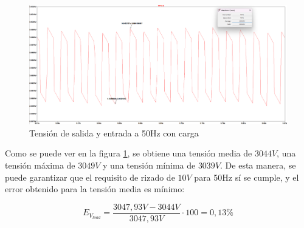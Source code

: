 \begin{figure}[H]
    \centering
    \includegraphics[width=1\textwidth]{Imagenes_alvaro/Vout_50hz_load.png}
    \caption{Tensión de salida y entrada a 50Hz con carga}
    \label{Vout_50hz_load}
\end{figure}

Como se puede ver en la figura \ref{Vout_50hz_load}, se obtiene una tensión media de $3044V$, una tensión máxima de $3049V$ y una tensión
mínima de $3039V$. De esta manera, se puede garantizar que el requisito de rizado de $10V$ para 50Hz sí se cumple, y el error obtenido 
para la tensión media es mínimo:

\begin{equation}
    E_{V_{load}} = \frac{3047,93V - 3044V}{3047,93V} \cdot 100 = 0,13\%
\end{equation}